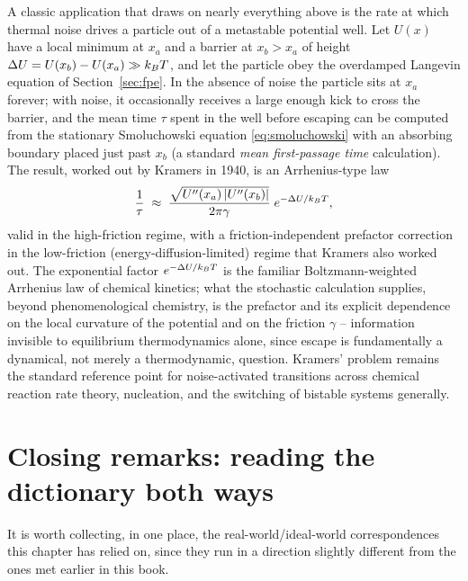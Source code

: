 A classic application that draws on nearly everything above is the rate at
which thermal noise drives a particle out of a metastable potential well.
Let $U(x)$ have a local minimum at $x_a$ and a barrier at $x_b > x_a$ of
height $\Delta U = U(x_b) - U(x_a) \gg k_{B} T$, and let the particle obey
the overdamped Langevin equation of Section~\ref{sec:fpe}. In the absence
of noise the particle sits at $x_a$ forever; with noise, it occasionally
receives a large enough kick to cross the barrier, and the mean time
$\tau$ spent in the well before escaping can be computed from the
stationary Smoluchowski equation \eqref{eq:smoluchowski} with an absorbing
boundary placed just past $x_b$ (a standard \emph{mean first-passage time}
calculation). The result, worked out by Kramers in 1940, is an
Arrhenius-type law
\begin{equation}
\frac{1}{\tau} \;\approx\; \frac{\sqrt{U''(x_a)\,|U''(x_b)|}}{2\pi\gamma}\;
e^{-\Delta U/k_{B} T},
\label{eq:kramers-rate}
\end{equation}
valid in the high-friction regime, with a friction-independent prefactor
correction in the low-friction (energy-diffusion-limited) regime that
Kramers also worked out. The exponential factor $e^{-\Delta U/k_{B} T}$ is
the familiar Boltzmann-weighted Arrhenius law of chemical kinetics; what
the stochastic calculation supplies, beyond phenomenological chemistry, is
the prefactor and its explicit dependence on the local curvature of the
potential and on the friction $\gamma$ -- information invisible to
equilibrium thermodynamics alone, since escape is fundamentally a dynamical,
not merely a thermodynamic, question. Kramers' problem remains the
standard reference point for noise-activated transitions across
chemical reaction rate theory, nucleation, and the switching of bistable
systems generally.

\section{Closing remarks: reading the dictionary both ways}
\label{sec:closing}

It is worth collecting, in one place, the real-world/ideal-world
correspondences this chapter has relied on, since they run in a direction
slightly different from the ones met earlier in this book.

